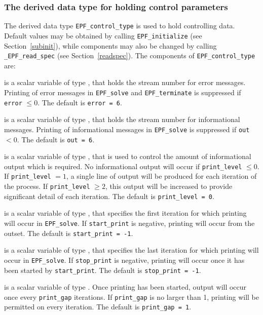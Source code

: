 \documentclass{galahad}
\newcommand{\packagename}{EPF}
\newcommand{\fullpackagename}{\libraryname\_\packagename}
\begin{document}

\subsubsection{The derived data type for holding control
 parameters}\label{typecontrol}
The derived data type
{\tt \packagename\_control\_type}
is used to hold controlling data. Default values may be obtained by calling
{\tt \packagename\_initialize}
(see Section~\ref{subinit}),
while components may also be changed by calling
{\tt \fullpackagename\_read\-\_spec}
(see Section~\ref{readspec}).
The components of
{\tt \packagename\_control\_type}
are:


\begin{description}

 is a scalar variable of type \integer, that holds the
stream number for error messages. Printing of error messages in
{\tt \packagename\_solve} and {\tt \packagename\_terminate}
is suppressed if {\tt error} $\leq 0$.
The default is {\tt error = 6}.

 is a scalar variable of type \integer, that holds the
stream number for informational messages. Printing of informational messages in
{\tt \packagename\_solve} is suppressed if {\tt out} $< 0$.
The default is {\tt out = 6}.

 is a scalar variable of type \integer, that is used
to control the amount of informational output which is required. No
informational output will occur if {\tt print\_level} $\leq 0$. If
{\tt print\_level} $= 1$, a single line of output will be produced for each
iteration of the process. If {\tt print\_level} $\geq 2$, this output will be
increased to provide significant detail of each iteration.
The default is {\tt print\_level = 0}.

 is a scalar variable of type \integer, that specifies
the first iteration for which printing will occur in {\tt \packagename\_solve}.
If {\tt start\_print} is negative, printing will occur from the outset.
The default is {\tt start\_print = -1}.

 is a scalar variable of type \integer, that specifies
the last iteration for which printing will occur in  {\tt \packagename\_solve}.
If {\tt stop\_print} is negative, printing will occur once it has been
started by {\tt start\_print}.
The default is {\tt stop\_print = -1}.

 is a scalar variable of type \integer.
Once printing has been started, output will occur once every
{\tt print\_gap} iterations. If {\tt print\_gap} is no larger than 1,
printing will be permitted on every iteration.
The default is {\tt print\_gap = 1}.


\end{description}
\end{document}
